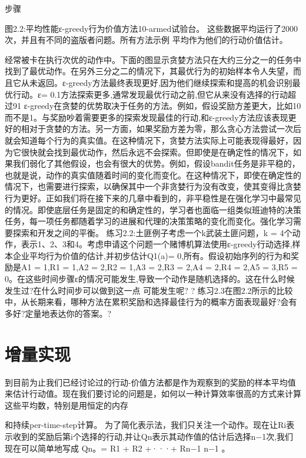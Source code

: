 步骤

图2.2:平均性能ε-greedy行为价值方法10-armed试验台。
这些数据平均运行了2000次，并且有不同的盗版者问题。所有方法示例
平均作为他们的行动价值估计。

经常被卡在执行次优的动作中。下面的图显示贪婪方法只在大约三分之一的任务中找到了最优动作。在另外三分之二的情况下，其最优行为的初始样本令人失望，而且它从未返回。ε-greedy方法最终表现更好,因为他们继续探索和提高的机会识别最优行动。ε= 0.1方法探索更多,通常发现最优行动之前,但它从来没有选择的行动超过91%
ε-greedy在贪婪的优势取决于任务的方法。例如，假设奖励方差更大，比如10而不是1。与奖励吵着需要更多的探索发现最佳的行动,和ε-greedy方法应该表现更好的相对于贪婪的方法。另一方面，如果奖励方差为零，那么贪心方法尝试一次后就会知道每个行为的真实值。在这种情况下，贪婪方法实际上可能表现得最好，因为它很快就会找到最优动作，然后永远不会探索。但即使是在确定性的情况下，如果我们弱化了其他假设，也会有很大的优势。例如，假设bandit任务是非平稳的，也就是说，动作的真实值随着时间的变化而变化。在这种情况下，即使在确定性的情况下，也需要进行探索，以确保其中一个非贪婪行为没有改变，使其变得比贪婪行为更好。正如我们将在接下来的几章中看到的，非平稳性是在强化学习中最常见的情况。即使底层任务是固定的和确定性的，学习者也面临一组类似班迪特的决策任务，每一项任务都随着学习的进展和代理的决策策略的变化而变化。强化学习需要探索和开发之间的平衡。
练习2.2:土匪例子考虑一个k武装土匪问题，k = 4个动作，表示1、2、3和4。考虑申请这个问题一个赌博机算法使用ε-greedy行动选择,样本企业平均行为价值的估计,并初步估计Q1(a)= 0,所有。假设初始序列的行为和奖励是A1 = 1,R1 = 1,A2 = 2,R2 = 1,A3 = 2,R3 = 2,A4 = 2,R4 = 2,A5 = 3,R5 = 0。在这些时间步骤ε的情况可能发生,导致一个动作是随机选择的。这在什么时候发生过?在什么时间步可以做到这一点
可能发生呢? 					?
练习2.3在图2.2所示的比较中，从长期来看，哪种方法在累积奖励和选择最佳行为的概率方面表现最好?会有多好?定量地表达你的答案。?


\section{增量实现}

到目前为止我们已经讨论过的行动-价值方法都是作为观察到的奖励的样本平均值来估计行动值。现在我们要讨论的问题是，如何以一种计算效率很高的方式来计算这些平均数，特别是用恒定的内存

和持续per-time-step计算。
为了简化表示法，我们只关注一个动作。现在让Ri表示收到的奖励后第i个选择的行动,并让Qn表示其动作值的估计后选择n−1次,我们现在可以简单地写成
Qn。= R1 + R2 +···+ Rn−1
n−1
。

